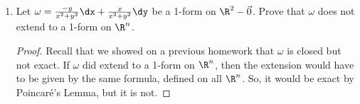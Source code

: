 \documentclass[letterpaper]{article}
\begin{document}
\begin{enumerate}
\begin{enumerate}
\begin{proof}
  \begin{comment}
  For $f_1, f_2$, we can write $f_2=\phi_2+g_2(y,z)$, $f_1=\phi_1+g_1(x,z)$, where each $g_i$ is only a function of the stated variables. Then we take double integrals:
	\[\begin{array}{rcl}
		\iint\frac{\del f_2}{\del x}\dx\dy&=&\iint\frac{\del f_1}{\del y}\dx\dy\\
		\iint\frac{\del (\phi_2+g_2)}{\del x}\dx\dy&=&\iint\frac{\del (\phi_1+g_1)}{\del y}\dx\dy\\
		\iint\frac{\del (\phi_2)}{\del x}\dx\dy&=&\iint\frac{\del (\phi_1)}{\del y}\dx\dy\\
		\int\phi_2\dy&=&\int\phi_1\dx\\
		\\
		\iint\frac{\del f_2}{\del x}\dx\dy&=&\iint\frac{\del f_1}{\del y}\dy\dx\\
		\int f_2+g_2(y,z)\dy&=&\int f_1 + g_1(x,z)\dx \\
		F_2+G_2(y)&=&F_1+G_1(x)\\
	
		
	
	\end{array}\]
	
  \end{comment}
	
	\end{proof}
	\item Show that if $X$ is a vector field on $\R^3$ with $\diverg X=0$, then $X =\curl Y$ for some vector field $Y$ on $\R^3$. 
	\begin{proof}
	Since $\diverg X=0$, then $(\diverg X)\dx\wedge\dy\wedge\dz=\der(\omega^2_X)=0$, so $\omega^2_X$ is exact. Then there is a one form $\eta$ such that $\der\eta=\omega^2_X$. Now $\eta=n_1\dx+n_2\dy+n_3\dz$ can be written as $\eta=\omega^1_Y$, where $Y=(n_1, n_2, n_3)$. Thus, 
	\[\omega^2_X=\der \eta=\der(\omega^1_Y)=\omega^2_{\curl Y},\]
	so $X=\curl Y$, by the linear independence argument of problem 3a. 
	\end{proof}
	
	\end{enumerate}
	
\item Let $\omega=\frac{-y}{x^2+y^2}	\dx + \frac{x}{x^2+y^2}	\dy $ be a 1-form on $\R^2-\vec{0}$. Prove that $\omega$ does not extend to a 1-form on $\R^n$. 
\begin{proof}
Recall that we showed on a previous homework that $\omega$ is closed but not exact. If $\omega$ did extend to a 1-form on $\R^n$, then the extension would have to be given by the same formula, defined on all $\R^n$. So, it would be exact by Poincar\'e's Lemma, but it is not. 
\end{proof} 
	
\end{enumerate}
\end{document}
